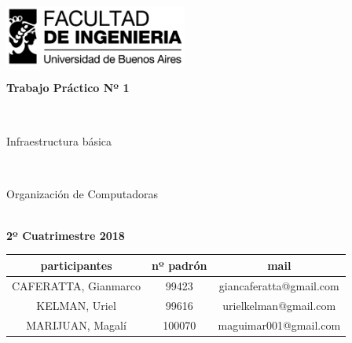 \documentclass[11pt]{article}
\begin{document}
\begin{titlepage}
        \hfill\includegraphics[width=6cm]{logofiuba.jpg}
        \center
        \vfill
        \vfill
        \begin{center}
            \begin{Huge}\textbf{Trabajo Práctico Nº 1}\end{Huge}\\
            \vfill
            \begin{Huge}Infraestructura básica\end{Huge}\\
            \vfill
            \begin{huge} Organización de Computadoras\end{huge}\\

            \textbf{2º Cuatrimestre 2018}  \\
            \vfill
            \begin{tabular}{|c|c|c|}
                \hline
                participantes & nº padrón & mail \\ \hline
                CAFERATTA, Gianmarco& 99423 & giancaferatta@gmail.com \\ \hline     
                KELMAN, Uriel &99616 &urielkelman@gmail.com \\\hline
                MARIJUAN, Magalí & 100070 & maguimar001@gmail.com\\ \hline
                
            \end{tabular}
            \vfill
            \vfill
            \vfill
            \vfill
            \vfill
            \vfill
        \end{center}
    
    \end{titlepage}
\end{document}
